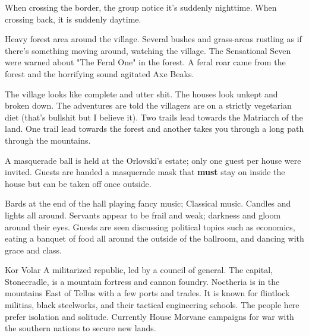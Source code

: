 
When crossing the border, the group notice it's suddenly nighttime. When crossing back, it is suddenly daytime.

	Heavy forest area around the village. Several bushes and grass-areas rustling as if there's something moving around, watching the village. The Sensational Seven were warned about "The Feral One" in the forest. A feral roar came from the forest and the horrifying sound agitated Axe Beaks.
	
The village looks like complete and utter shit. The houses look unkept and broken down. The adventures are told the villagers are on a strictly vegetarian diet (that's bullshit but I believe it). Two trails lead towards the Matriarch of the land. One trail lead towards the forest and another takes you through a long path through the mountains.


	A masquerade ball is held at the Orlovski's estate; only one guest per house were invited. Guests are handed a masquerade mask that \textbf{must} stay on inside the house but can be taken off once outside.
	
	Bards at the end of the hall playing fancy music; Classical music. Candles and lights all around. Servants appear to be frail and weak; darkness and gloom around their eyes. Guests are seen discussing political topics such as economics, eating a banquet of food all around the outside of the ballroom, and dancing with grace and class.
	
\begin{DndSidebar}[float=!b]{Kor Volar}
A militarized republic, led by a council of general. The capital, Stonecradle, is a  mountain fortress and cannon foundry. Noctheria is in the mountains East of Tellus with a few ports and trades. It is known for flintlock militias, black steelworks, and their tactical engineering schools. The people here prefer isolation and solitude. Currently House Morvane campaigns for war with the southern nations to secure new lands.
\end{DndSidebar}